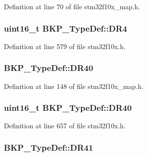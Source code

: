 Definition at line 70 of file stm32f10x\+\_\+map.\+h.

\subsubsection[{\texorpdfstring{D\+R4}{DR4}}]{ {\bf uint16\+\_\+t} B\+K\+P\+\_\+\+Type\+Def\+::\+D\+R4}\hypertarget{struct_b_k_p___type_def_a02abe76a58a7f018ea450221c955ab30}{}\label{struct_b_k_p___type_def_a02abe76a58a7f018ea450221c955ab30}


Definition at line 579 of file stm32f10x.\+h.

\subsubsection[{\texorpdfstring{D\+R40}{DR40}}]{ B\+K\+P\+\_\+\+Type\+Def\+::\+D\+R40}\hypertarget{struct_b_k_p___type_def_aff7eb46b0eb3122b53f0d922b4fc910c}{}\label{struct_b_k_p___type_def_aff7eb46b0eb3122b53f0d922b4fc910c}


Definition at line 148 of file stm32f10x\+\_\+map.\+h.

\subsubsection[{\texorpdfstring{D\+R40}{DR40}}]{ {\bf uint16\+\_\+t} B\+K\+P\+\_\+\+Type\+Def\+::\+D\+R40}\hypertarget{struct_b_k_p___type_def_a1811cf03bde48bc9becc8795d3e09d7f}{}\label{struct_b_k_p___type_def_a1811cf03bde48bc9becc8795d3e09d7f}


Definition at line 657 of file stm32f10x.\+h.

\subsubsection[{\texorpdfstring{D\+R41}{DR41}}]{ B\+K\+P\+\_\+\+Type\+Def\+::\+D\+R41}\hypertarget{struct_b_k_p___type_def_af32b1c16a2b370a4ca7208265b382a7c}{}\label{struct_b_k_p___type_def_af32b1c16a2b370a4ca7208265b382a7c}


